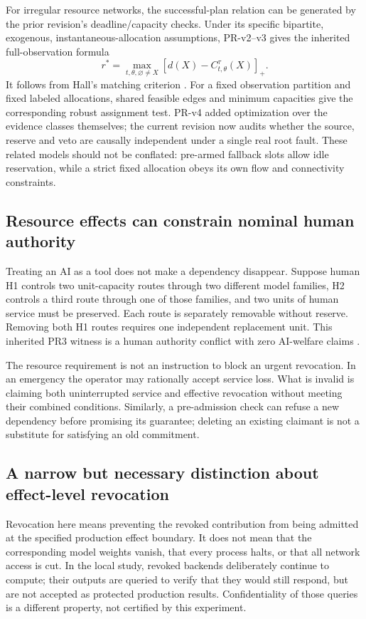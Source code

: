 \documentclass[11pt,a4paper]{article}
\theoremstyle{definition}\newtheorem{definition}{Definition}
\newcommand{\pos}[1]{\left[#1\right]_+}
\begin{document}
For irregular resource networks, the successful-plan relation can be generated by the prior revision's deadline/capacity checks. Under its specific bipartite, exogenous, instantaneous-allocation assumptions, PR-v2--v3 gives the inherited full-observation formula
\begin{equation}
\label{eq:hall}
r^*=\max_{t,\theta,\varnothing\ne X}\pos{d(X)-C^\tau_{t,\theta}(X)}.
\end{equation}
It follows from Hall's matching criterion \cite{hall,liu3}. For a fixed observation partition and fixed labeled allocations, shared feasible edges and minimum capacities give the corresponding robust assignment test. PR-v4 added optimization over the evidence classes themselves; the current revision now audits whether the source, reserve and veto are causally independent under a single real root fault. These related models should not be conflated: pre-armed fallback slots allow idle reservation, while a strict fixed allocation obeys its own flow and connectivity constraints.

\subsection{Resource effects can constrain nominal human authority}
Treating an AI as a tool does not make a dependency disappear. Suppose human H1 controls two unit-capacity routes through two different model families, H2 controls a third route through one of those families, and two units of human service must be preserved. Each route is separately removable without reserve. Removing both H1 routes requires one independent replacement unit. This inherited PR3 witness is a human authority conflict with zero AI-welfare claims \cite{liu3}.

The resource requirement is not an instruction to block an urgent revocation. In an emergency the operator may rationally accept service loss. What is invalid is claiming both uninterrupted service and effective revocation without meeting their combined conditions. Similarly, a pre-admission check can refuse a new dependency before promising its guarantee; deleting an existing claimant is not a substitute for satisfying an old commitment.

\subsection{A narrow but necessary distinction about effect-level revocation}
Revocation here means preventing the revoked contribution from being admitted at the specified production effect boundary. It does not mean that the corresponding model weights vanish, that every process halts, or that all network access is cut. In the local study, revoked backends deliberately continue to compute; their outputs are queried to verify that they would still respond, but are not accepted as protected production results. Confidentiality of those queries is a different property, not certified by this experiment.
\end{document}
